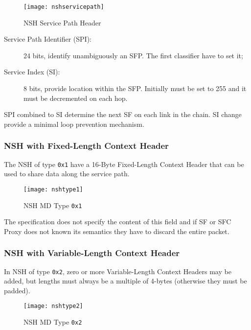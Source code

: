 \begin{figure}[H]
  \centering
  \texttt{[image: nshservicepath]}
  \caption{NSH Service Path Header~\cite{rfc8300}}
  \label{chap:background:img:nshpath}
\end{figure}

\begin{description}
  \item[Service Path Identifier (SPI):] 24 bits, identify unambiguously an SFP.
  The first classifier have to set it;
  \item[Service Index (SI):] 8 bits, provide location within the SFP. Initially
  must be set to 255 and it must be decremented on each hop.
\end{description}

SPI combined to SI determine the next SF on each link in the chain. SI change
provide a minimal loop prevention mechanism.

\subsubsection{NSH with Fixed-Length Context Header}
\label{subsubsec:background:flch}
The NSH of type \texttt{0x1} have a 16-Byte Fixed-Length Context Header that
can be used to share data along the service path.

\begin{figure}[H]
  \centering
  \texttt{[image: nshtype1]}
  \caption{NSH MD Type \texttt{0x1}~\cite{rfc8300}}
  \label{chap:background:img:nshtype1}
\end{figure}

The specification does not specify the content of this field and if SF or SFC
Proxy does not known its semantics they have to discard the entire packet. 

\subsubsection{NSH with Variable-Length Context Header}
\label{subsubsec:background:vlch}
In NSH of type \texttt{0x2}, zero or more Variable-Length Context Headers may
be added, but lengths must always be a multiple of 4-bytes (otherwise they must
be padded).

\begin{figure}[H]
  \centering
  \texttt{[image: nshtype2]}
  \caption{NSH MD Type \texttt{0x2}~\cite{rfc8300}}
  \label{chap:background:img:nshtype2}
\end{figure}

